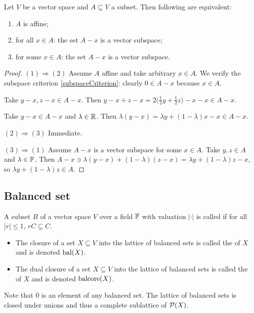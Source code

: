 \begin{proposition}
Let $V$ be a vector space and $A\subseteq V$ a subset. Then following are equivalent:
\begin{enumerate}
\item $A$ is affine;
\item for all $x\in A$: the set $A-x$ is a vector subspace;
\item for some $x\in A$: the set $A-x$ is a vector subspace.
\end{enumerate}
\end{proposition}
\begin{proof}
$(1) \Rightarrow (2)$ Assume $A$ affine and take arbitrary $x\in A$. We verify the subspace criterion \ref{subspaceCriterion}: clearly $0\in A-x$ because $x\in A$.

Take $y-x, z-x \in A-x$. Then $y-x + z-x = 2\Big(\frac{1}{2}y + \frac{1}{2}z\Big) - x -x \in A-x$.

Take $y-x\in A-x$ and $\lambda\in \mathbb{R}$. Then $\lambda(y-x) = \lambda y + (1-\lambda)x - x \in A-x$.

$(2) \Rightarrow (3)$ Immediate.

$(3) \Rightarrow (1)$ Assume $A-x$ is a vector subspace for some $x\in A$. Take $y,z\in A$ and $\lambda\in \mathbb{F}$. Then $A-x \ni \lambda(y-x)+(1-\lambda)(z-x) = \lambda y + (1-\lambda)z - x$, so $\lambda y + (1-\lambda)z \in A$. 
\end{proof}


\subsection{Balanced set}
\begin{definition}
A subset $B$ of a vector space $V$ over a field $\mathbb{F}$ with valuation $|\cdot|$ is called  if for all $|r|\leq 1$, $rC \subseteq C$.

\begin{itemize}
\item The closure of a set $X\subseteq V$ into the lattice of balanced sets is called the  of $X$ and is denoted $\operatorname{bal}(X)$.
\item The dual closure of a set $X\subseteq V$ into the lattice of balanced sets is called the  of $X$ and is denoted $\operatorname{balcore}(X)$.
\end{itemize}
\end{definition}
Note that $0$ is an element of any balanced set. The lattice of balanced sets is closed under unions and thus a complete sublattice of $\operatorname{\mathcal{P}}(X)$.

